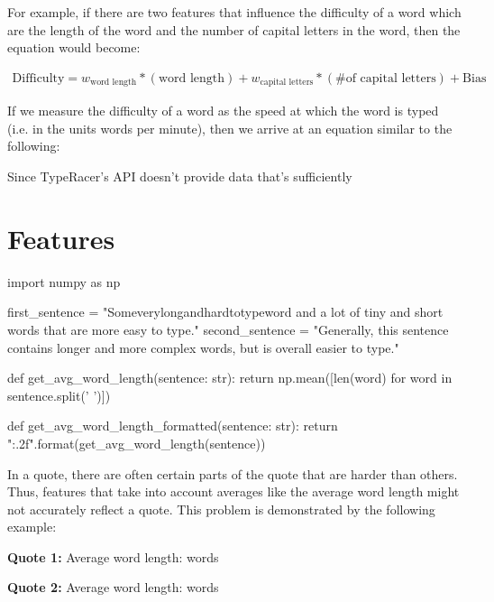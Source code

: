 \documentclass[12pt]{article}
\newenvironment{textexamples}
  {\medskip\par\setlength{\parindent}{0pt}}
  {\par\medskip}
\begin{document}
For example, if there are two features that influence the difficulty of a word which are the length of the word and the number of capital letters in the word, then the equation would become:

\begin{align*}
\text{Difficulty} = w_{\text{word length}} * (\text{word length}) + w_{\text{capital letters}} * (\text{\# of capital letters}) + \text{Bias}
\end{align*}



If we measure the difficulty of a word as the speed at which the word is typed (i.e. in the units words per minute), then we arrive at an equation similar to the following:

Since TypeRacer's API doesn't provide data that's sufficiently

\section{Features}

\begin{pycode}
import numpy as np

first_sentence = "Someverylongandhardtotypeword and a lot of tiny and short words that are more easy to type."
second_sentence = "Generally, this sentence contains longer and more complex words, but is overall easier to type."

def get_avg_word_length(sentence: str):
	return np.mean([len(word) for word in sentence.split(' ')])

def get_avg_word_length_formatted(sentence: str):
	return "{:.2f}".format(get_avg_word_length(sentence))
\end{pycode}

In a quote, there are often certain parts of the quote that are harder than others. Thus, features that take into account averages like the average word length might not accurately reflect a quote. This problem is demonstrated by the following example:

\medskip

\begin{textexamples}
	\textbf{Quote 1:} 
	\newline
	Average word length:  words

	\smallskip

	\textbf{Quote 2:} 
	\newline
	Average word length:  words
\end{textexamples}
\end{document}
